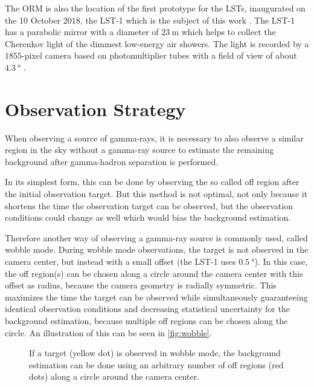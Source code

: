 The ORM is also the location of the first prototype for the LSTs, inaugurated on the 10 October 2018, the LST-1 which is the subject of this work \cite{lst_inauguration}.
The LST-1 has a parabolic mirror with a diameter of $\SI{23}{\meter}$ which helps to collect the Cherenkov light of the dimmest low-energy air showers.
The light is recorded by a $\num{1855}$-pixel camera based on photomultiplier tubes with a field of view of about $\SI{4.3}{\degree}$ \cite{cta-website}.


\section{Observation Strategy}
\label{sec:wobble}
When observing a source of gamma-rays, it is necessary to also observe a similar region in the sky without a gamma-ray source to estimate the 
remaining background after gamma-hadron separation is performed.

In its simplest form, this can be done by observing the so called off region after the initial observation target.
But this method is not optimal, not only because it shortens the time the observation target can be observed, but the observation conditions could
change as well which would bias the background estimation.

Therefore another way of observing a gamma-ray source is commonly used, called wobble mode.
During wobble mode observations, the target is not observed in the camera center, but instead with a small offset (the LST-1 uses $\SI{0.5}{\degree}$).
In this case, the off region(s) can be chosen along a circle around the camera center with this offset as radius, because the camera geometry is radially symmetric.
This maximizes the time the target can be observed while simultaneously guaranteeing identical observation conditions and decreasing statistical uncertainty 
for the background estimation, because multiple off regions can be chosen along the circle.
An illustration of this can be seen in \autoref{fig:wobble}.

\begin{figure}
    \centering
    \caption{If a target (yellow dot) is observed in wobble mode, the background estimation can be done using an arbitrary number of off regions 
        (red dots) along a circle around the camera center.
    }
    \label{fig:wobble}
\end{figure}


